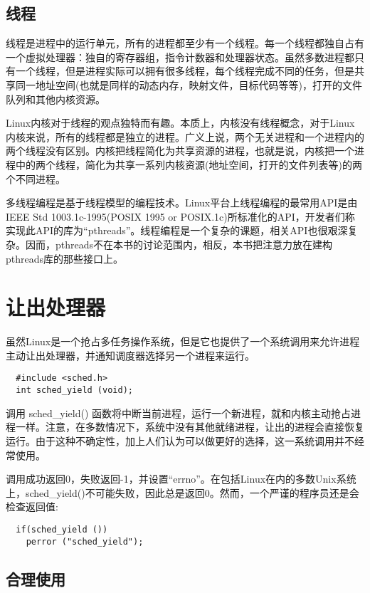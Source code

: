 \subsection{线程}

线程是进程中的运行单元，所有的进程都至少有一个线程。每一个线程都独自占有一个虚拟处理器：独自的寄存器组，指令计数器和处理器状态。虽然多数进程都只有一个线程，但是进程实际可以拥有很多线程，每个线程完成不同的任务，但是共享同一地址空间(也就是同样的动态内存，映射文件，目标代码等等)，打开的文件队列和其他内核资源。

Linux内核对于线程的观点独特而有趣。本质上，内核没有线程概念，对于Linux内核来说，所有的线程都是独立的进程。广义上说，两个无关进程和一个进程内的两个线程没有区别。内核把线程简化为共享资源的进程，也就是说，内核把一个进程中的两个线程，简化为共享一系列内核资源(地址空间，打开的文件列表等)的两个不同进程。

多线程编程是基于线程模型的编程技术。Linux平台上线程编程的最常用API是由IEEE Std 1003.1c-1995(POSIX 1995 or POSIX.1c)所标准化的API，开发者们称实现此API的库为“pthreads”。线程编程是一个复杂的课题，相关API也很艰深复杂。因而，pthreads不在本书的讨论范围内，相反，本书把注意力放在建构pthreads库的那些接口上。

\section{让出处理器}

虽然Linux是一个抢占多任务操作系统，但是它也提供了一个系统调用来允许进程主动让出处理器，并通知调度器选择另一个进程来运行。
\begin{lstlisting}
  #include <sched.h>
  int sched_yield (void);
\end{lstlisting}

调用 sched\_yield() 函数将中断当前进程，运行一个新进程，就和内核主动抢占进程一样。注意，在多数情况下，系统中没有其他就绪进程，让出的进程会直接恢复运行。由于这种不确定性，加上人们认为可以做更好的选择，这一系统调用并不经常使用。

调用成功返回0，失败返回-1，并设置“errno”。在包括Linux在内的多数Unix系统上，sched\_yield()不可能失败，因此总是返回0。然而，一个严谨的程序员还是会检查返回值:

\begin{lstlisting}
  if(sched_yield ())
    perror ("sched_yield");
\end{lstlisting}

\subsection{合理使用}

